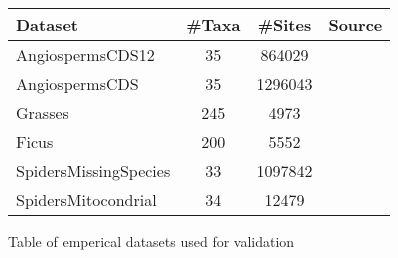\begin{tabular} { l c c c}
   Dataset & \#Taxa & \#Sites & Source \\
   \hline
   AngiospermsCDS12 & 35 & 864029 & \cite{ran_phylogenomics_2018}\\
   AngiospermsCDS & 35 & 1296043 & \cite{ran_phylogenomics_2018}\\
   Grasses & 245 & 4973 & \cite{christin_molecular_2014}\\
   Ficus & 200 & 5552 & \cite{cruaud_extreme_2012}\\
   SpidersMissingSpecies & 33 & 1097842 & \cite{leduc-robert_phylogeny_2018}\\
   SpidersMitocondrial & 34 & 12479 & \cite {leduc-robert_phylogeny_2018}\\
\end{tabular}
\caption{Table of emperical datasets used for validation}
